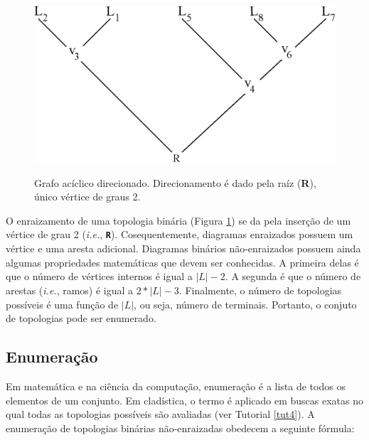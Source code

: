 \begin{refsection}
  \begin{figure}[H]
  \centering
       \centering
      {\includegraphics[scale=0.60]{figures/tut3/directed_graph.eps}}
      {\caption[\textit{Gráfos}]{Grafo acíclico direcionado. Direcionamento é dado pela raíz (\textbf{R}), único vértice de graus 2.}\label{tut3:fig:rooted_graph}}
  \end{figure}

	
	O enraizamento de uma topologia binária (Figura \ref{tut3:fig:rooted_graph}) se da pela inserção de um vértice de grau 2 (\textit{i.e.}, \textbf{\texttt{R}}). Cosequentemente, diagramas enraizados possuem um vértice e uma aresta adicional. Diagramas binários não-enraizados possuem ainda algumas propriedades matemáticas que devem ser conhecidas. A primeira delas é que o número de vértices internos é igual a $|L|-2$. A segunda é que o número de arestas (\textit{i.e.}, ramos) é igual a $2*|L|-3$. Finalmente, o número de topologias possíveis é uma função de $|L|$, ou seja, número de terminais. Portanto, o conjuto de topologias pode ser enumerado.
	
\subsection{Enumeração}\label{tut3:context:enumeration}
	Em matemática e na ciência da computação, enumeração é a lista de todos os elementos de um conjunto. Em cladística, o termo é aplicado em buscas exatas no qual todas as topologias possíveis são avaliadas (ver Tutorial \ref{tut4}). A enumeração de topologias binárias não-enraizadas obedecem a seguinte fórmula:


\end{refsection}
